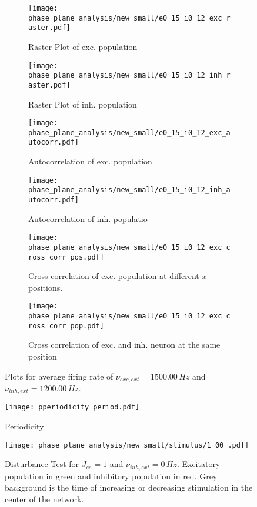 \documentclass[a4paper,12pt]{article}
\begin{document}
\begin{figure}
    \begin{subfigure}[b]{0.49\textwidth}
        \texttt{[image: phase\_plane\_analysis/new\_small/e0\_15\_i0\_12\_exc\_raster.pdf]}
        \caption{Raster Plot of exc. population}
    \end{subfigure}
    \begin{subfigure}[b]{0.49\textwidth}
        \texttt{[image: phase\_plane\_analysis/new\_small/e0\_15\_i0\_12\_inh\_raster.pdf]}
        \caption{Raster Plot of inh. population}
    \end{subfigure}
    \begin{subfigure}[b]{0.49\textwidth}
        \texttt{[image: phase\_plane\_analysis/new\_small/e0\_15\_i0\_12\_exc\_autocorr.pdf]}
        \caption{Autocorrelation of exc. population}
    \end{subfigure}
    \begin{subfigure}[b]{0.49\textwidth}
        \texttt{[image: phase\_plane\_analysis/new\_small/e0\_15\_i0\_12\_inh\_autocorr.pdf]}
        \caption{Autocorrelation of inh. populatio}
    \end{subfigure}
    \begin{subfigure}[b]{0.49\textwidth}
        \texttt{[image: phase\_plane\_analysis/new\_small/e0\_15\_i0\_12\_exc\_cross\_corr\_pos.pdf]}
        \caption{Cross correlation of exc. population at different $x$-positions.}
    \end{subfigure}
    \begin{subfigure}[b]{0.49\textwidth}
        \texttt{[image: phase\_plane\_analysis/new\_small/e0\_15\_i0\_12\_exc\_cross\_corr\_pop.pdf]}
        \caption{Cross correlation of exc. and inh. neuron at the same position}
    \end{subfigure}
    \caption{Plots for average firing rate of 
                $\nu_{exc,ext} = 1500.00 \,\si{Hz}$ and $\nu_{inh,ext} = 1200.00 \,\si{Hz}$.
                }
\end{figure}
    
    \begin{figure}
    \centering
        \texttt{[image: pperiodicity\_period.pdf]}
        \caption{
            Periodicity
            }
    \end{figure}
    \clearpage
    \begin{figure}
    \centering
        \texttt{[image: phase\_plane\_analysis/new\_small/stimulus/1\_00\_.pdf]}
        \caption{
            Disturbance Test for $J_{ee} = 1$ and $\nu_{inh,ext} = 0 \,\si{Hz}$.
            Excitatory population in green and inhibitory population in red. 
            Grey background is the time of increasing or decreasing stimulation 
            in the center of the network.
            }
    \end{figure}
    
\end{document}
